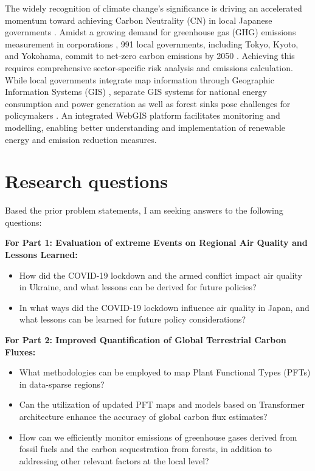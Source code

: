 The widely recognition of climate change's significance \citep{primack2009impact, watanabe2009general, ogawa2013ecological, shibuya2016effect} is driving an accelerated momentum toward achieving Carbon Neutrality (CN) in local Japanese governments \citep{nakazawa2023net}. Amidst a growing demand for greenhouse gas (GHG) emissions measurement in corporations \citep{kauffmann2012corporate}, 991 local governments, including Tokyo, Kyoto, and Yokohama, commit to net-zero carbon emissions by 2050 \citep{zerocarboncities}. Achieving this requires comprehensive sector-specific risk analysis and emissions calculation. While local governments integrate map information through Geographic Information Systems (GIS) \citep{nikkei}, separate GIS systems for national energy consumption and power generation as well as forest sinks pose challenges for policymakers \citep{Toshihiko, kitamoto, nlftp}. An integrated WebGIS platform facilitates monitoring and modelling, enabling better understanding and implementation of renewable energy and emission reduction measures. \par
\section{Research questions}
Based the prior problem statements, I am seeking answers to the following questions:

\textbf{For Part 1: Evaluation of extreme Events on Regional Air Quality and Lessons Learned:}
\begin{itemize}
    \item How did the COVID-19 lockdown and the armed conflict impact air quality in Ukraine, and what lessons can be derived for future policies?
    \item In what ways did the COVID-19 lockdown influence air quality in Japan, and what lessons can be learned for future policy considerations?
\end{itemize}

\textbf{For Part 2: Improved Quantification of Global Terrestrial Carbon Fluxes:}
\begin{itemize}
    \item What methodologies can be employed to map Plant Functional Types (PFTs) in data-sparse regions?
    \item Can the utilization of updated PFT maps and models based on Transformer architecture enhance the accuracy of global carbon flux estimates?
    \item How can we efficiently monitor emissions of greenhouse gases derived from fossil fuels and the carbon sequestration from forests, in addition to addressing other relevant factors at the local level?
\end{itemize}

